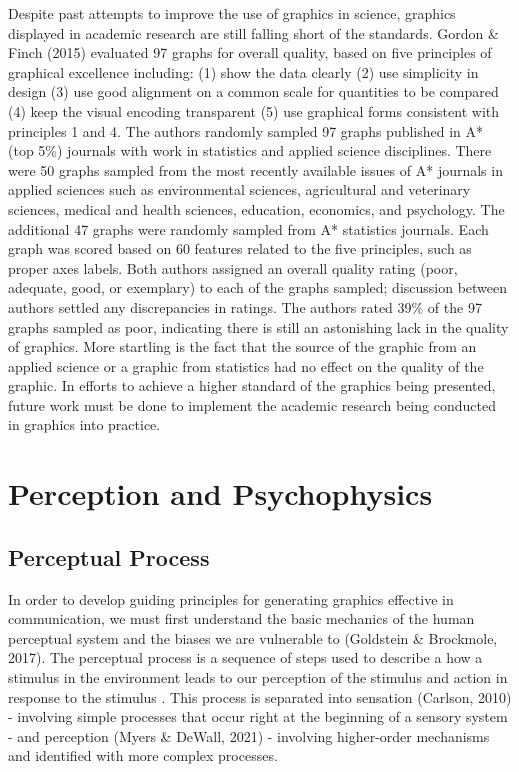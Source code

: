 \documentclass[print]{nuthesis}
\begin{document}
Despite past attempts to improve the use of graphics in science, graphics displayed in academic research are still falling short of the standards. Gordon \& Finch (2015) evaluated 97 graphs for overall quality, based on five principles of graphical excellence including: (1) show the data clearly (2) use simplicity in design (3) use good alignment on a common scale for quantities to be compared (4) keep the visual encoding transparent (5) use graphical forms consistent with principles 1 and 4.
The authors randomly sampled 97 graphs published in A* (top 5\%) journals with work in statistics and applied science disciplines.
There were 50 graphs sampled from the most recently available issues of A* journals in applied sciences such as environmental sciences, agricultural and veterinary sciences, medical and health sciences, education, economics, and psychology.
The additional 47 graphs were randomly sampled from A* statistics journals.
Each graph was scored based on 60 features related to the five principles, such as proper axes labels.
Both authors assigned an overall quality rating (poor, adequate, good, or exemplary) to each of the graphs sampled; discussion between authors settled any discrepancies in ratings.
The authors rated 39\% of the 97 graphs sampled as poor, indicating there is still an astonishing lack in the quality of graphics.
More startling is the fact that the source of the graphic from an applied science or a graphic from statistics had no effect on the quality of the graphic.
In efforts to achieve a higher standard of the graphics being presented, future work must be done to implement the academic research being conducted in graphics into practice.

\hypertarget{perception-and-psychophysics}{%
\section{Perception and Psychophysics}\label{perception-and-psychophysics}}

\hypertarget{perceptual-process}{%
\subsection{Perceptual Process}\label{perceptual-process}}

In order to develop guiding principles for generating graphics effective in communication, we must first understand the basic mechanics of the human perceptual system and the biases we are vulnerable to (Goldstein \& Brockmole, 2017).
The perceptual process is a sequence of steps used to describe a how a stimulus in the environment leads to our perception of the stimulus and action in response to the stimulus .
This process is separated into sensation (Carlson, 2010) - involving simple processes that occur right at the beginning of a sensory system - and perception (Myers \& DeWall, 2021) - involving higher-order mechanisms and identified with more complex processes.
\end{document}
